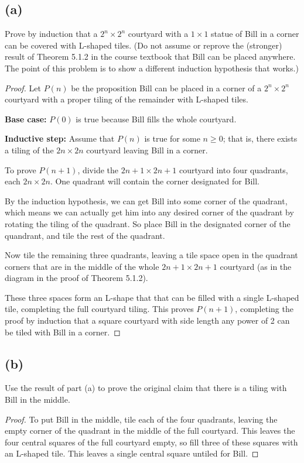 \documentclass[14pt]{extarticle}
\begin{document}
\subsection{(a)}
Prove by induction that a $2^n \times 2^n$ courtyard with a $1 \times 1$ statue of Bill in a corner can be covered with L-shaped tiles. (Do not assume or reprove the (stronger) result of Theorem 5.1.2 in the course textbook that Bill can be placed anywhere. The point of this problem is to show a different induction hypothesis that works.)
\begin{proof}
Let $P(n)$ be the proposition Bill can be placed in a corner of a $2^n \times 2^n$ courtyard with a proper tiling of the remainder with L-shaped tiles.

{\bf Base case:} $P(0)$ is true because Bill fills the whole courtyard.

{\bf Inductive step:} Assume that $P(n)$ is true for some $n\geq 0$; that is, there exists a tiling of the $2n\times 2n$ courtyard leaving Bill in a corner.

To prove $P(n + 1)$, divide the $2n+1 \times 2n+1$ courtyard into four quadrants, each $2n\times 2n$. One quadrant will contain the corner designated for Bill. 

By the induction hypothesis, we can get Bill into some corner of the quadrant, which means we can actually get him into any desired corner of the quadrant by rotating the tiling of the quadrant. So place Bill in the designated corner of the quandrant, and tile the rest of the quadrant.

Now tile the remaining three quadrants, leaving a tile space open in the quadrant corners that are in the middle of the whole $2n+1 \times 2n+1$ courtyard (as in the diagram in the proof of Theorem 5.1.2).

These three spaces form an L-shape that that can be filled with a single L-shaped tile, completing the full courtyard tiling. This proves $P(n + 1)$, completing the proof by induction that a square
courtyard with side length any power of 2 can be tiled with Bill in a corner.
\end{proof}

\subsection{(b)}
Use the result of part (a) to prove the original claim that there is a tiling with Bill in the middle.
\begin{proof}
To put Bill in the middle, tile each of the four quadrants, leaving the empty corner of the quadrant in the middle of the full courtyard. This leaves the four central squares of the full courtyard empty, so fill three of these squares with an L-shaped tile. This leaves a single central square untiled for Bill.
\end{proof}
\end{document}
